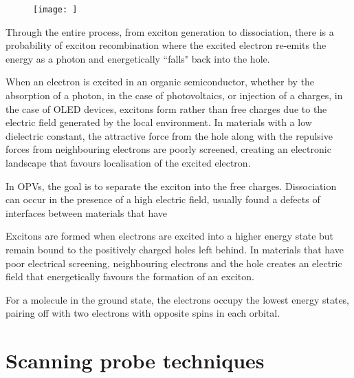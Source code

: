 \begin{figure}[h]
    \centering
    \texttt{[image: ]}
    \caption{}
    \label{fig:intro:ct}
\end{figure}

Through the entire process, from exciton generation to dissociation, there is a probability of exciton recombination where the excited electron re-emits the energy as a photon and energetically ``falls" back into the hole. 






When an electron is excited in an organic semiconductor, whether by the absorption of a photon, in the case of photovoltaics, or injection of a charges, in the case of \ac{OLED} devices, excitons form rather than free charges due to the electric field generated by the local environment. In materials with a low dielectric constant, the attractive force from the hole along with the repulsive forces from neighbouring electrons are poorly screened, creating an electronic landscape that favours localisation of the excited electron. 

In \acp{OPV}, the goal is to separate the exciton into the free charges. Dissociation can occur in the presence of a high electric field, usually found a defects of interfaces between materials that have 



Excitons are formed when electrons are excited into a higher energy state but remain bound to the positively charged holes left behind. In materials that have poor electrical screening, neighbouring electrons and the hole creates an electric field that energetically favours the formation of an exciton. 


For a molecule in the ground state, the electrons occupy the lowest energy states, pairing off with two electrons with opposite spins in each orbital. 


\section{Scanning probe techniques}














